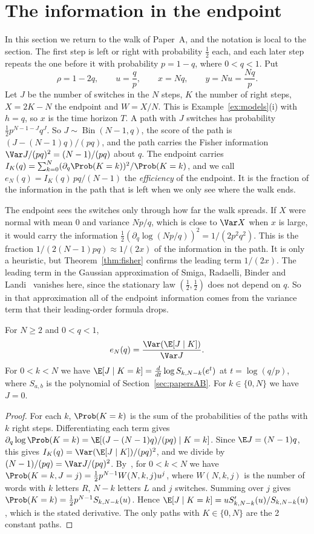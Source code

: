 \section{The information in the endpoint}\label{sec:fisher}

In this section we return to the walk of Paper~A, and the notation is local
to the section. The first step is left or right with probability $\frac12$
each, and each later step repeats the one before it with probability
$p=1-q$, where $0<q<1$. Put
\[
 \rho=1-2q,\qquad u=\frac qp,\qquad x=Nq,\qquad y=Nu=\frac{Nq}p .
\]
Let $J$ be the number of switches in the $N$ steps, $K$ the number of right
steps, $X=2K-N$ the endpoint and $W=X/N$. This is Example~\ref{ex:models}(i)
with $h=q$, so $x$ is the time horizon $T$. A path with $J$ switches has
probability $\frac12p^{N-1-J}q^J$. So $J\sim\operatorname{Bin}(N-1,q)$, the
score of the path is $(J-(N-1)q)/(pq)$, and the path carries the Fisher
information $\Var J/(pq)^2=(N-1)/(pq)$ about $q$. The endpoint carries
$I_K(q)=\sum_{k=0}^N(\partial_q\Prob(K=k))^2/\Prob(K=k)$, and we call
$e_N(q)=I_K(q)\,pq/(N-1)$ the \emph{efficiency} of the endpoint. It is the
fraction of the information in the path that is left when we only see where
the walk ends.

The endpoint sees the switches only through how far the walk spreads. If
$X$ were normal with mean $0$ and variance $Np/q$, which is close to
$\Var X$ when $x$ is large, it would carry the information
$\frac12(\partial_q\log(Np/q))^2=1/(2p^2q^2)$. This is the fraction
$1/(2(N-1)pq)\approx1/(2x)$ of the information in the path. It is only a
heuristic, but Theorem~\ref{thm:fisher} confirms the leading term $1/(2x)$.
The leading term in the Gaussian approximation of Smiga, Radaelli, Binder
and Landi~\cite{smiga2023} vanishes here, since the stationary law
$(\frac12,\frac12)$ does not depend on $q$. So in that approximation all of
the endpoint information comes from the variance term that their
leading-order formula drops.

\begin{proposition}\label{prop:eta}
For $N\ge2$ and $0<q<1$,
\[
 e_N(q)=\frac{\Var(\E[J\mid K])}{\Var J}.
\]
For $0<k<N$ we have $\E[J\mid K=k]=\frac{d}{dt}\log S_{k,N-k}(e^t)$ at
$t=\log(q/p)$, where $S_{a,b}$ is the polynomial of
Section~\ref{sec:papersAB}. For $k\in\{0,N\}$ we have $J=0$.
\end{proposition}

\begin{proof}
For each $k$, $\Prob(K=k)$ is the sum of the probabilities of the paths
with $k$ right steps. Differentiating each term gives
$\partial_q\log\Prob(K=k)=\E[(J-(N-1)q)/(pq)\mid K=k]$. Since
$\E J=(N-1)q$, this gives $I_K(q)=\Var(\E[J\mid K])/(pq)^2$, and we divide
by $(N-1)/(pq)=\Var J/(pq)^2$. By~\cite[Thm.~2.1]{paperA}, for $0<k<N$ we
have $\Prob(K=k,J=j)=\frac12p^{N-1}W(N,k,j)u^j$, where $W(N,k,j)$ is the
number of words with $k$ letters $R$, $N-k$ letters $L$ and $j$ switches.
Summing over $j$ gives $\Prob(K=k)=\frac12p^{N-1}S_{k,N-k}(u)$. Hence
$\E[J\mid K=k]=uS'_{k,N-k}(u)/S_{k,N-k}(u)$, which is the stated
derivative. The only paths with $K\in\{0,N\}$ are the 2 constant paths.
\end{proof}

